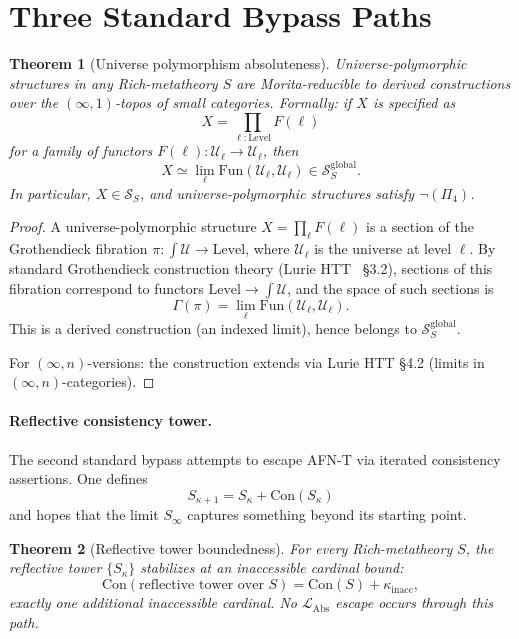 \documentclass[11pt]{article}
\theoremstyle{plain}
\newtheorem{theorem}{Theorem}[section]
\theoremstyle{definition}
\newcommand{\cS}{\mathcal{S}}
\newcommand{\LAbs}{\mathcal{L}_{\mathrm{Abs}}}
\newcommand{\Fun}{\mathrm{Fun}}
\newcommand{\Con}{\mathrm{Con}}
\newcommand{\cU}{\mathcal{U}}
\begin{document}
\section{Three Standard Bypass Paths}\label{sec:bypass}

\begin{theorem}[Universe polymorphism absoluteness]\label{thm:universe}
Universe-polymorphic structures in any Rich-metatheory $S$ are Morita-reducible to derived constructions over the $(\infty, 1)$-topos of small categories. Formally: if $X$ is specified as
\[ X = \prod_{\ell : \mathrm{Level}} F(\ell) \]
for a family of functors $F(\ell) : \cU_\ell \to \cU_\ell$, then
\[ X \simeq \lim_\ell \Fun(\cU_\ell, \cU_\ell) \in \cS_S^{\mathrm{global}}. \]
In particular, $X \in \cS_S$, and universe-polymorphic structures satisfy $\neg (\Pi_4)$.
\end{theorem}

\begin{proof}
A universe-polymorphic structure $X = \prod_\ell F(\ell)$ is a section of the Grothendieck fibration $\pi : \int \cU \to \mathrm{Level}$, where $\cU_\ell$ is the universe at level $\ell$. By standard Grothendieck construction theory (Lurie HTT~\cite{LurieHTT} \S 3.2), sections of this fibration correspond to functors $\mathrm{Level} \to \int \cU$, and the space of such sections is
\[ \Gamma(\pi) = \lim_\ell \Fun(\cU_\ell, \cU_\ell). \]
This is a derived construction (an indexed limit), hence belongs to $\cS_S^{\mathrm{global}}$.

For $(\infty, n)$-versions: the construction extends via Lurie HTT \S 4.2 (limits in $(\infty, n)$-categories).
\end{proof}

\paragraph{Reflective consistency tower.} The second standard bypass attempts to escape AFN-T via iterated consistency assertions. One defines
\[ S_{\kappa+1} = S_\kappa + \Con(S_\kappa) \]
and hopes that the limit $S_\infty$ captures something beyond its starting point.

\begin{theorem}[Reflective tower boundedness]\label{thm:reflective}
For every Rich-metatheory $S$, the reflective tower $\{S_\kappa\}$ stabilizes at an inaccessible cardinal bound:
\[ \Con(\text{reflective tower over }S) = \Con(S) + \kappa_{\mathrm{inacc}}, \]
exactly one additional inaccessible cardinal. No $\LAbs$ escape occurs through this path.
\end{theorem}
\end{document}
